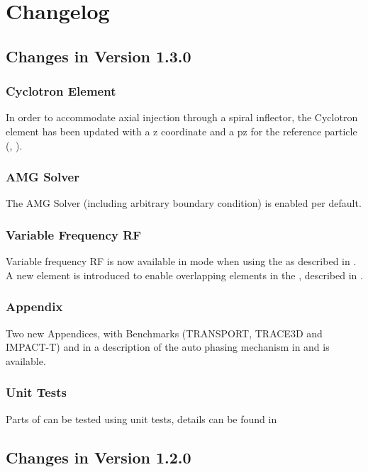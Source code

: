 

\chapter{Changelog}
\label{chp:changelog}

\section{Changes in \opal Version 1.3.0}
\subsection{Cyclotron Element}
In order to accommodate axial injection through a spiral inflector, the Cyclotron element has been updated with
a z coordinate and a pz for the reference particle (, ).

\subsection{AMG Solver}
The AMG Solver (including arbitrary boundary condition) is enabled per default.

\subsection{Variable Frequency RF}
Variable frequency RF is now available in \opalcycl mode when using the
 as described in
. A new 
element is introduced to enable overlapping elements in the
, described in .

\subsection{Appendix}
Two new Appendices,   with Benchmarks (TRANSPORT, TRACE3D and IMPACT-T) and in  a description of the auto phasing mechanism in \opalt and \opalenv is available.

\subsection{Unit Tests}
Parts of \opal can be tested using unit tests, details can be found in 

\section{Changes in \opal Version 1.2.0}
